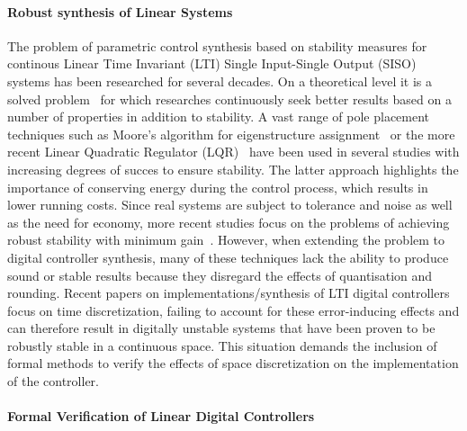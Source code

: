 \documentclass{sig-alternate-05-2015}
\begin{document}
\paragraph{Robust synthesis of Linear Systems} 

The problem of parametric control synthesis based on stability measures for
continous Linear Time Invariant (LTI) Single Input-Single Output (SISO)
systems has been researched for several decades.  On a theoretical level it
is a solved problem~\cite{wonham1967pole} for which researches continuously
seek better results based on a number of properties in addition to
stability.  A vast range of pole placement techniques such as Moore's
algorithm for eigenstructure assignment~\cite{klein1977eigenvalue} or the
more recent Linear Quadratic Regulator (LQR)~\cite{bemporad2002explicit}
have been used in several studies with increasing degrees of succes to
ensure stability.  The latter approach highlights the importance of
conserving energy during the control process, which results in lower running
costs.  Since real systems are subject to tolerance and noise as well as the
need for economy, more recent studies focus on the problems of achieving
robust stability with minimum
gain~\cite{schmid2014unified,konigorski2012pole}.  However, when extending
the problem to digital controller synthesis, many of these techniques lack
the ability to produce sound or stable results because they disregard the
effects of quantisation and rounding.  Recent papers on
implementations/synthesis of LTI digital
controllers~\cite{das2013lqr,ghosh2013fpga} focus on time discretization,
failing to account for these error-inducing effects and can therefore result
in digitally unstable systems that have been proven to be robustly stable in
a continuous space.  This situation demands the inclusion of formal methods
to verify the effects of space discretization on the implementation of the
controller.

\paragraph{Formal Verification of Linear Digital Controllers} 
\end{document}

